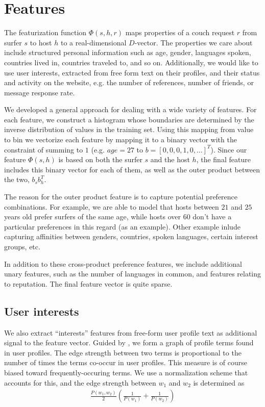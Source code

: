 \section{Features} \label{sec:features}

The featurization function $\Phi(s,h,r)$ maps properties of a couch request $r$ from surfer $s$ to host $h$ to a real-dimensional $D$-vector.
The properties we care about include structured personal information such as age, gender, languages spoken, countries lived in, countries traveled to, and so on.
Additionally, we would like to use user interests, extracted from free form text on their profiles, and their status and activity on the website, e.g. the number of references, number of friends, or message response rate.

We developed a general approach for dealing with a wide variety of features.
For each feature, we construct a histogram whose boundaries are determined by the inverse distribution of values in the training set.
Using this mapping from value to bin we vectorize each feature by mapping it to a binary vector with the constraint of summing to $1$ (e.g. $age=27$ to $b=[0,0,0,1,0,\dots]^T$).
Since our feature $\Phi(s,h)$ is based on both the surfer $s$ and the host $h$, the final feature includes this binary vector for each of them, as well as the outer product between the two, $b_s b_h^T$.

The reason for the outer product feature is to capture potential preference combinations.
For example, we are able to model that hosts between $21$ and $25$ years old prefer surfers of the same age, while hosts over $60$ don't have a particular preferences in this regard (as an example).
Other example inlude capturing affinities between genders, countries, spoken languages, certain interest groups, etc.

In addition to these cross-product preference features, we include additional unary features, such as the number of languages in common, and features relating to reputation.
The final feature vector is quite sparse.

\subsection{User interests} \label{subsec:user_interests}

We also extract ``interests'' features from free-form user profile text as additional signal to the feature vector.
Guided by \cite{Liu2005,Liu2006,Cantador2011}, we form a graph of profile terms found in user profiles.
The edge strength between two terms is proportional to the number of times the terms co-occur in user profiles.
This measure is of course biased toward frequently-occuring terms.
We use a normalization scheme that accounts for this, and the edge strength between $w_1$ and $w_2$ is determined as
\begin{eqnarray}
\frac{P(w_1,w_2)}{2} (\frac{1}{P(w_1)} + \frac{1}{P(w_2)})
\end{eqnarray}

